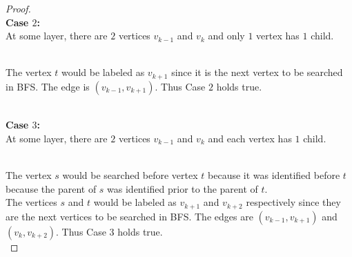 \documentclass{article}
\theoremstyle{definition}
\theoremstyle{remark}
\theoremstyle{plain}
\begin{document}
\begin{proof}
\\

\textbf{Case $2$:}\\
At some layer, there are $2$ vertices $v_{k-1}$ and $v_k$ and only $1$ vertex has $1$ child.\\

\\

The vertex $t$ would be labeled as $v_{k+1}$ since it is the next vertex to be searched in BFS. The edge is $(v_{k-1}, v_{k+1})$. Thus Case $2$ holds true.\\

\\


\textbf{Case $3$:} \\
At some layer, there are $2$ vertices $v_{k-1}$ and $v_k$ and each vertex has $1$ child.\\

\\

The vertex $s$ would be searched before vertex $t$ because it was identified before $t$ because the parent of $s$ was identified prior to the parent of $t$.\\
The vertices $s$ and $t$ would be labeled as $v_{k+1}$ and $v_{k+2}$ respectively since they are the next vertices to be searched in BFS. The edges are $(v_{k-1}, v_{k+1})$ and $(v_k, v_{k+2})$. Thus Case $3$ holds true.\\


\end{proof}
\end{document}
